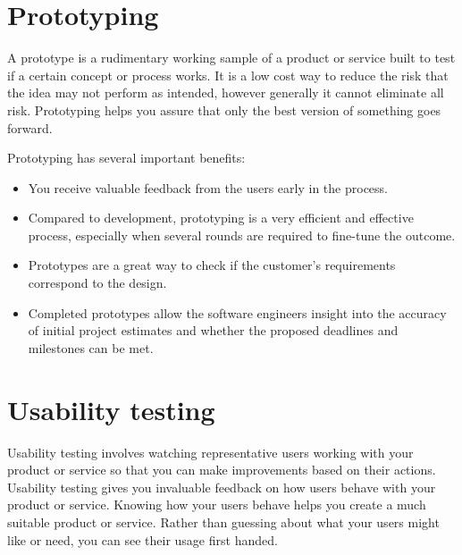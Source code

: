     \section{Prototyping}\label{sec:prototyping}
    A prototype is a rudimentary working sample of a product or service built to test if a certain concept or process works. It is a low cost way to reduce the risk that the idea may not perform as intended, however generally it cannot eliminate all risk. Prototyping helps you assure that only the best version of something goes forward.
    
    Prototyping has several important benefits: 
    \begin{itemize}
        \item {You receive valuable feedback from the users early in the process.}
        \item { Compared to development, prototyping is a very efficient and effective process, especially when several rounds are required to fine-tune the outcome. }
        \item {Prototypes are a great way to check if the customer's requirements correspond to the design. }
        \item {Completed prototypes allow the software engineers insight into the accuracy of initial project estimates and whether the proposed deadlines and milestones can be met.}
        
    \end{itemize}
    
    \section{Usability testing} 
    Usability testing involves watching representative users working with your product or service so that you can make improvements based on their actions. Usability testing gives you invaluable feedback on how users behave with your product or service. Knowing how your users behave helps you create a much suitable product or service. 
    Rather than guessing about what your users might like or need, you can see their usage first handed. 
    
